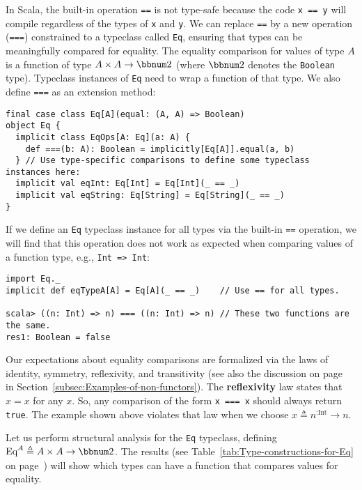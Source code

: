 In Scala, the built-in operation \lstinline!==! is not type-safe
because the code \lstinline!x == y! will compile regardless of the
types of \lstinline!x! and \lstinline!y!. We can replace \lstinline!==!
by a new operation (\lstinline!===!) constrained to a typeclass called
\lstinline!Eq!, ensuring that types can be meaningfully compared
for equality. The equality comparison for values of type $A$ is a
function of type $A\times A\rightarrow\bbnum 2$ (where $\bbnum 2$
denotes the \lstinline!Boolean! type). Typeclass instances of \lstinline!Eq!
need to wrap a function of that type. We also define \lstinline!===!
as an extension method:
\begin{lstlisting}
final case class Eq[A](equal: (A, A) => Boolean)
object Eq {
  implicit class EqOps[A: Eq](a: A) {
    def ===(b: A): Boolean = implicitly[Eq[A]].equal(a, b)
  } // Use type-specific comparisons to define some typeclass instances here:
  implicit val eqInt: Eq[Int] = Eq[Int](_ == _)
  implicit val eqString: Eq[String] = Eq[String](_ == _)
}
\end{lstlisting}
If we define an \lstinline!Eq! typeclass instance for all types via
the built-in \lstinline!==! operation, we will find that this operation
does not work as expected when comparing values of a function type,
e.g., \lstinline!Int => Int!: 
\begin{lstlisting}
import Eq._
implicit def eqTypeA[A] = Eq[A](_ == _)    // Use == for all types.

scala> ((n: Int) => n) === ((n: Int) => n) // These two functions are the same.
res1: Boolean = false 
\end{lstlisting}
Our expectations about equality comparisons are formalized via the
laws of identity, symmetry, reflexivity, and transitivity (see also
the discussion on page~\pageref{par:label-equality-laws} in Section~\ref{subsec:Examples-of-non-functors}).
The \textbf{reflexivity} law states that $x=x$
for any $x$. So, any comparison of the form \lstinline!x === x!
should always return \lstinline!true!. The example shown above violates
that law when we choose $x\triangleq n^{:\text{Int}}\rightarrow n$.

Let us perform structural analysis for the \lstinline!Eq! typeclass,
defining $\text{Eq}^{A}\triangleq A\times A\rightarrow\bbnum 2$.
The results (see Table~\ref{tab:Type-constructions-for-Eq} on page~\pageref{tab:Type-constructions-for-Eq})
will show which types can have a function that compares values for
equality.

